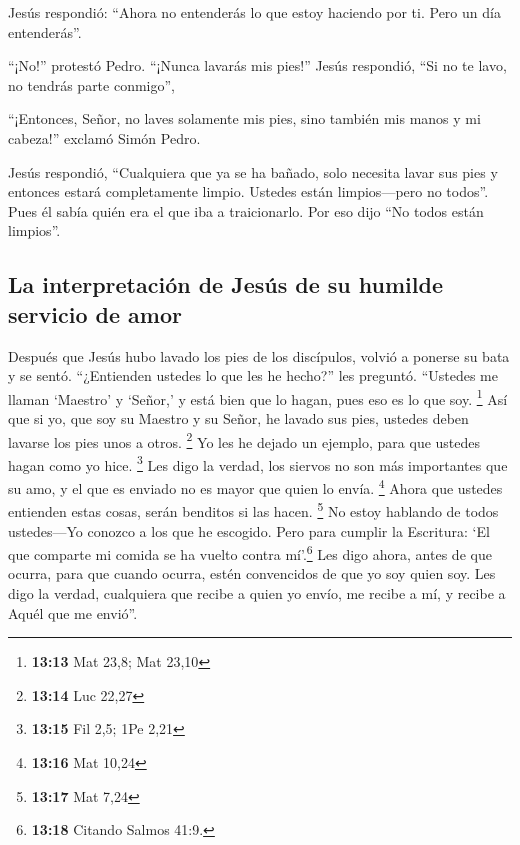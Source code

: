  Jesús respondió: ``Ahora no entenderás lo que estoy
haciendo por ti. Pero un día entenderás''.

 ``¡No!'' protestó Pedro. ``¡Nunca lavarás mis pies!''
Jesús respondió, ``Si no te lavo, no tendrás parte conmigo'',

 ``¡Entonces, Señor, no laves solamente mis pies, sino
también mis manos y mi cabeza!'' exclamó Simón Pedro.

 Jesús respondió, ``Cualquiera que ya se ha bañado, solo
necesita lavar sus pies y entonces estará completamente limpio. Ustedes
están limpios---pero no todos''.  Pues él sabía quién era
el que iba a traicionarlo. Por eso dijo ``No todos están limpios''.

\hypertarget{la-interpretaciuxf3n-de-jesuxfas-de-su-humilde-servicio-de-amor}{%
\subsection{La interpretación de Jesús de su humilde servicio de
amor}\label{la-interpretaciuxf3n-de-jesuxfas-de-su-humilde-servicio-de-amor}}

 Después que Jesús hubo lavado los pies de los
discípulos, volvió a ponerse su bata y se sentó. ``¿Entienden ustedes lo
que les he hecho?'' les preguntó.  ``Ustedes me llaman
`Maestro' y `Señor,' y está bien que lo hagan, pues eso es lo que soy.
\footnote{\textbf{13:13} Mat 23,8; Mat 23,10}  Así que si
yo, que soy su Maestro y su Señor, he lavado sus pies, ustedes deben
lavarse los pies unos a otros. \footnote{\textbf{13:14} Luc 22,27}
 Yo les he dejado un ejemplo, para que ustedes hagan como
yo hice. \footnote{\textbf{13:15} Fil 2,5; 1Pe 2,21}  Les
digo la verdad, los siervos no son más importantes que su amo, y el que
es enviado no es mayor que quien lo envía. \footnote{\textbf{13:16} Mat
  10,24}  Ahora que ustedes entienden estas cosas, serán
benditos si las hacen. \footnote{\textbf{13:17} Mat 7,24}
 No estoy hablando de todos ustedes---Yo conozco a los
que he escogido. Pero para cumplir la Escritura: `El que comparte mi
comida se ha vuelto contra mí'.\footnote{\textbf{13:18} Citando Salmos
  41:9.}  Les digo ahora, antes de que ocurra, para que
cuando ocurra, estén convencidos de que yo soy quien soy.
 Les digo la verdad, cualquiera que recibe a quien yo
envío, me recibe a mí, y recibe a Aquél que me envió''.

